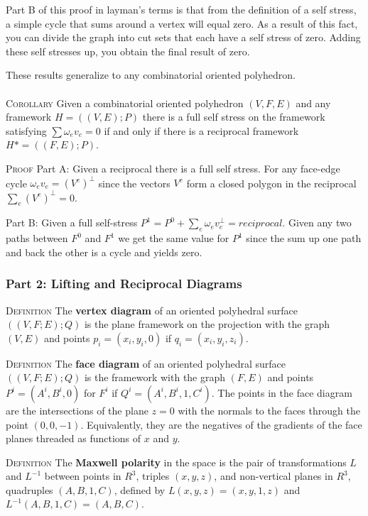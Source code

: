 \documentclass[11pt]{article}
\begin{document}
Part B of this proof in layman's terms is that from the definition of a self stress, a simple cycle that sums around a vertex will equal zero. As a result of this fact, you can divide the graph into cut sets that each have a self stress of zero. Adding these self stresses up, you obtain the final result of zero.

These results generalize to any combinatorial oriented polyhedron. \\
\\
\textsc{Corollary} Given a combinatorial oriented polyhedron $(V,F,E)$ and any framework $H = ((V,E);P)$ there is a full self stress on the framework satisfying $\sum \omega_ev_e = 0$ if and only if there is a reciprocal framework $H* = ((F,E);P)$. 

\textsc{Proof} Part A: Given a reciprocal there is a full self stress.
For any face-edge cycle $\omega_e v_e = (V^e)^{\bot}$ since the vectors $V^e$ form a closed polygon in the reciprocal $\sum_e(V^e)^\bot = 0$.

Part B: Given a full self-stress $P^1 = P^0 + \sum_e \omega_ev_e^\bot = reciprocal$.
Given any two paths between $F^0$ and $F^1$ we get the same value for $P^1$ since the sum up one path and back the other is a cycle and yields zero.


\subsubsection{Part 2: Lifting and Reciprocal Diagrams}
\textsc{Definition} The \textbf{vertex diagram} of an oriented polyhedral surface $((V,F;E);Q)$ is the plane framework on the projection with the graph $(V,E)$ and points $p_i = (x_i,y_i,0)$ if $q_i = (x_i,y_i,z_i)$.


\textsc{Definition} The \textbf{face diagram} of an oriented polyhedral surface $((V,F;E);Q)$ is the framework with the graph $(F,E)$ and points $P^i = (A^i,B^i,0)$ for $F^i$ if $Q^i = (A^i,B^i,1,C^i)$. The points in the face diagram are the intersections of the plane $z=0$ with the normals to the faces through the point $(0,0,-1)$. Equivalently, they are the negatives of the gradients of the face planes threaded as functions of $x$ and $y$.
 
 \textsc{Definition} The \textbf{Maxwell polarity} in the space is the pair of transformations $L$ and $L^{-1}$ between points in $R^3$, triples $(x,y,z)$, and non-vertical planes in $R^3$, quadruples $(A,B,1,C)$, defined by $L(x,y,z)=(x,y,1,z)$ and $L^{-1}(A,B,1,C) = (A,B,C)$.
 
\end{document}
